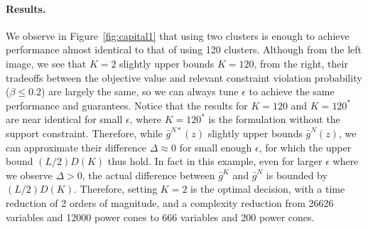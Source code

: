 {\paragraph{Results.}  We observe in Figure~\ref{fig:capital1} that using two clusters is enough to achieve performance almost identical to that of using 120 clusters.
Although from the left image, we see that $K=2$ slightly upper bounds $K = 120$, from the right, their tradeoffs between the objective value and relevant constraint violation probability ($\beta \leq 0.2$) are largely the same, so we can always tune $\epsilon$ to achieve the same performance and guarantees.
Notice that the results for $K = 120$ and $K=120^*$ are near identical for small $\epsilon$, where $K=120^*$ is the formulation without the support constraint. Therefore, while $ \bar{g}^{N*}(z)$ slightly upper bounds $\bar{g}^N(z)$, we can approximate their difference $\Delta \approx 0$ for small enough $\epsilon$, for which the upper bound $(L/2)D(K)$ thus hold.
In fact in this example, even for larger $\epsilon$ where we observe $\Delta > 0$, the actual difference between $\bar{g}^K$ and $\bar{g}^N$ is bounded by $(L/2)D(K)$.
Therefore, setting $K = 2$ is the optimal decision, with a time reduction of 2 orders of magnitude, and a complexity reduction from 26626 variables and 12000 power cones to 666 variables and 200 power cones.



}
